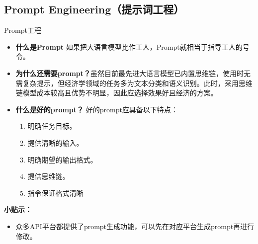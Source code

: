 \documentclass{beamer}
\begin{document}
\subsection{Prompt Engineering（提示词工程）}
\begin{frame}[fragile]{Prompt工程}
    \small
\begin{itemize}
  \item 	\textbf{什么是Prompt} 如果把大语言模型比作工人，Prompt就相当于指导工人的号令。
  \item \textbf{为什么还需要prompt？}虽然目前最先进大语言模型已内置思维链，使用时无需复杂提示，但经济学领域的任务多为文本分类和语义识别。此时，采用思维链模型成本较高且优势不明显，因此应选择效果好且经济的方案。
  \item \textbf{什么是好的prompt？} 好的prompt应具备以下特点：
   \begin{enumerate}
      \item 明确任务目标。
      \item 提供清晰的输入。
      \item 明确期望的输出格式。
      \item 提供思维链。
      \item 指令保证格式清晰
    \end{enumerate}
\end{itemize}
\textbf{小贴示：} 
\begin{itemize}
    \item 众多API平台都提供了prompt生成功能，可以先在对应平台生成prompt再进行修改。
\end{itemize}
\end{frame}
\end{document}
